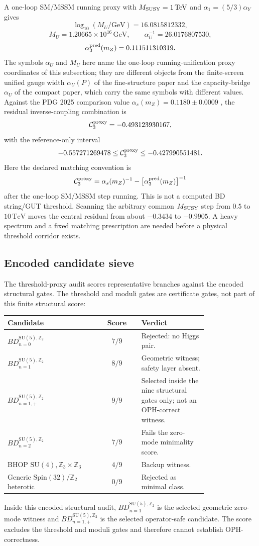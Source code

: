 \documentclass[11pt]{article}
\theoremstyle{remark}
\theoremstyle{plain}
\newcommand{\SU}{\mathrm{SU}}
\newcommand{\Z}{\mathbb Z}
\begin{document}
A one-loop SM/MSSM running proxy with \(M_{\rm SUSY}=1\,\mathrm{TeV}\) and
\(\alpha_1=(5/3)\alpha_Y\) gives
\[
\log_{10}(M_U/\mathrm{GeV})=16.0815812332,
\]
\[
M_U=1.20665\times10^{16}\,\mathrm{GeV},
\qquad
\alpha_U^{-1}=26.0176807530,
\]
\[
\alpha_3^{\rm pred}(m_Z)=0.111511310319.
\]
The symbols \(\alpha_U\) and \(M_U\) here name the one-loop running-unification proxy
coordinates of this subsection; they are different objects from the finite-screen unified
gauge width \(\alpha_U(P)\) of the fine-structure paper and the capacity-bridge \(\alpha_U\)
of the compact paper, which carry the same symbols with different values.
Against the PDG 2025 comparison value
\(\alpha_s(m_Z)=0.1180\pm0.0009\) \cite{PDG2025QCD}, the residual inverse-coupling combination is
\[
\mathcal C_3^{\rm proxy}=-0.493123930167,
\]
with the reference-only interval
\[
-0.557271269478
\leq
\mathcal C_3^{\rm proxy}
\leq
-0.427990551481.
\]
Here the declared matching convention is
\[
\mathcal C_3^{\rm proxy}
=
\alpha_s(m_Z)^{-1}-\bigl[\alpha_3^{\rm pred}(m_Z)\bigr]^{-1}
\]
after the one-loop SM/MSSM step running. This is not a computed BD string/GUT threshold.
Scanning the arbitrary common \(M_{\rm SUSY}\) step from
\(0.5\) to \(10\,\mathrm{TeV}\) moves the central residual from about \(-0.3434\) to
\(-0.9905\). A heavy spectrum and a fixed matching prescription are needed before a physical
threshold corridor exists.

\subsection{Encoded candidate sieve}

The threshold-proxy audit scores representative branches against the encoded structural gates. The
threshold and moduli gates are certificate gates, not part of this finite structural score:
\begin{longtable}{p{0.46\linewidth}c p{0.33\linewidth}}
\toprule
\textbf{Candidate} & \textbf{Score} & \textbf{Verdict} \\
\midrule
\(BD_{n=0}^{\SU(5),\Z_2}\) & \(7/9\) & Rejected: no Higgs pair. \\
\(BD_{n=1}^{\SU(5),\Z_2}\) & \(8/9\) & Geometric witness; safety layer absent. \\
\(BD_{n=1,+}^{\SU(5),\Z_2}\) & \(9/9\) & Selected inside the nine structural gates only;
not an OPH-correct witness. \\
\(BD_{n=2}^{\SU(5),\Z_2}\) & \(7/9\) & Fails the zero-mode minimality score. \\
BHOP \(\SU(4),\Z_3\times\Z_3\) & \(4/9\) & Backup witness. \\
Generic \(\mathrm{Spin}(32)/\Z_2\) heterotic & \(0/9\) & Rejected as minimal class. \\
\bottomrule
\end{longtable}
Inside this encoded structural audit, \(BD_{n=1}^{\SU(5),\Z_2}\) is the selected geometric
zero-mode witness and \(BD_{n=1,+}^{\SU(5),\Z_2}\) is the selected operator-safe candidate.
The score excludes the threshold and moduli gates and therefore cannot establish OPH-correctness.
\end{document}
